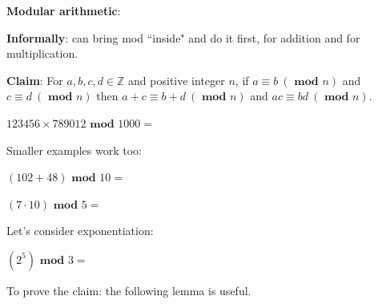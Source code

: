 
{\bf Modular arithmetic}: 


{\bf Informally}: can bring mod ``inside" and do it first, for addition and for multiplication.

{\bf Claim}: For $a, b, c, d \in \mathbb{Z}$ 
and positive integer $n$, if $a \equiv b ~(\textbf{ mod } n)$ and $c \equiv d ~(\textbf{ mod } n)$ 
then $a+c \equiv b+d ~(\textbf{ mod } n)$ and $ac \equiv bd ~(\textbf{ mod } n)$.

$123456 \times 789012 \textbf{ mod } 1000 = $

\vfill

Smaller examples work too: 

$(102 + 48) \textbf{ mod } 10 = $ 

$(7 \cdot 10) \textbf{ mod } 5 =$

Let's consider exponentiation: 

$(2^5) \textbf{ mod } 3 = $ 

\vfill

To prove the claim: the following lemma is useful.
